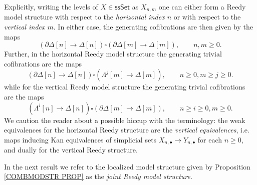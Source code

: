 \documentclass[a4paper,10pt,draft]{article}%
\begin{document}
Explicitly, writing the levels of 
$X \in \mathsf{ssSet}$ as $X_{n,m}$
one can either form a Reedy model structure with respect to the 
\textit{horizontal index $n$}
or with respect to the 
\textit{vertical index $m$}.
In either case, the generating cofibrations are then given by the maps
\[
	\left( \partial \Delta[n] \to \Delta[n] \right)
\square
	\left( \partial \Delta[m] \to \Delta[m] \right),
	\qquad n,m\geq 0.
\]
Further, in the horizontal Reedy model structure the generating trivial cofibrations are the maps
\begin{equation}\label{GTRCOHOR EQ}
	\left( \partial \Delta[n] \to \Delta[n] \right)
\square
	\left( \Lambda^j[m] \to \Delta[m] \right),
\qquad n\geq 0,m\geq j \geq 0.
\end{equation}
while for the vertical Reedy model structure the generating trivial cofibrations are the maps
\begin{equation}\label{GTRCOVER EQ}
	\left( \Lambda^i[n] \to \Delta[n] \right)
\square
	\left( \partial \Delta[m] \to \Delta[m] \right),
\qquad n \geq i \geq 0,m\geq 0.
\end{equation}
We caution the reader about a possible hiccup with the terminology: 
the weak equivalences for the horizontal Reedy structure are the 
\textit{vertical equivalences},
i.e. maps inducing Kan equivalences of simplicial sets
$X_{n,\bullet} \to Y_{n,\bullet}$
for each $n \geq 0$, and dually for the vertical Reedy structure.


In the next result we refer to the localized model structure given by Proposition \ref{COMBMODSTR PROP} as the 
\textit{joint Reedy model structure}.
\end{document}
